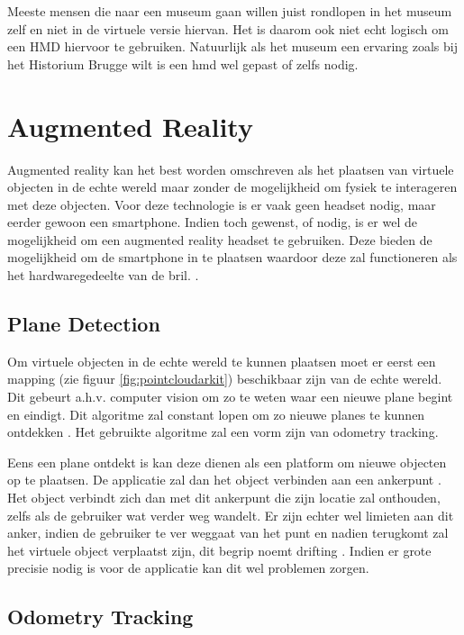 Meeste mensen die naar een museum gaan willen juist rondlopen in het museum zelf en niet in de virtuele versie hiervan. Het is daarom ook niet echt logisch om een HMD hiervoor te gebruiken. Natuurlijk als het museum een ervaring zoals bij het Historium Brugge wilt is een \acrshort{hmd} wel gepast of zelfs nodig.

\section{Augmented Reality} \label{sec:augmentedreality}
Augmented reality kan het best worden omschreven als het plaatsen van virtuele objecten in de echte wereld maar zonder de mogelijkheid om fysiek te interageren met deze objecten. Voor deze technologie is er vaak geen headset nodig, maar eerder gewoon een smartphone. Indien toch gewenst, of nodig, is er wel de mogelijkheid om een augmented reality headset te gebruiken. Deze bieden de mogelijkheid om de smartphone in te plaatsen waardoor deze zal functioneren als het hardwaregedeelte van de bril. \autocite{Schops2014}.

\subsection{Plane Detection}
Om virtuele objecten in de echte wereld te kunnen plaatsen moet er eerst een mapping (zie figuur \ref{fig:pointcloudarkit}) beschikbaar zijn van de echte wereld. Dit gebeurt a.h.v. computer vision om zo te weten waar een nieuwe plane begint en eindigt. Dit algoritme zal constant lopen om zo nieuwe planes te kunnen ontdekken \autocite{Xu2018}. Het gebruikte algoritme zal een vorm zijn van odometry tracking.

Eens een plane ontdekt is kan deze dienen als een platform om nieuwe objecten op te plaatsen. De applicatie zal dan het object verbinden aan een ankerpunt \autocite{ARCoreAnchor}. Het object verbindt zich dan met dit ankerpunt die zijn locatie zal onthouden, zelfs als de gebruiker wat verder weg wandelt. Er zijn echter wel limieten aan dit anker, indien de gebruiker te ver weggaat van het punt en nadien terugkomt zal het virtuele object verplaatst zijn, dit begrip noemt drifting \autocite{You1999}. Indien er grote precisie nodig is voor de applicatie kan dit wel problemen zorgen.

\subsection{Odometry Tracking}


